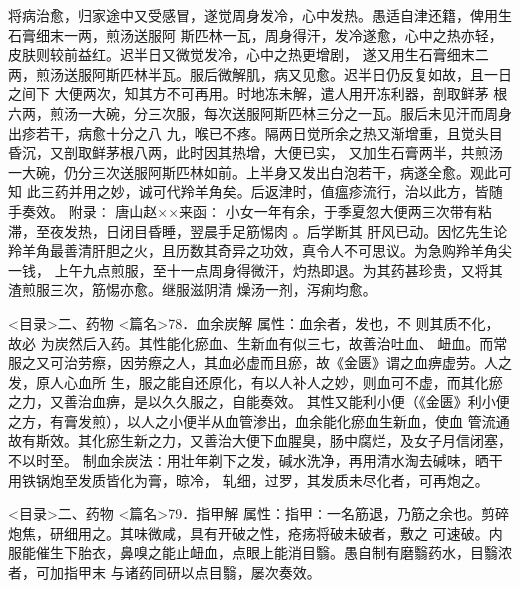 \documentclass[a4paper,12pt,UTF8,twoside]{ctexbook}
\begin{document}
将病治愈，归家途中又受感冒，遂觉周身发冷，心中发热。愚适自津还籍，俾用生石膏细末一两，煎汤送服阿 
斯匹林一瓦，周身得汗，发冷遂愈，心中之热亦轻，皮肤则较前益红。迟半日又微觉发冷，心中之热更增剧， 
遂又用生石膏细末二两，煎汤送服阿斯匹林半瓦。服后微解肌，病又见愈。迟半日仍反复如故，且一日之间下 
大便两次，知其方不可再用。时地冻未解，遣人用开冻利器，剖取鲜茅 
根六两，煎汤一大碗，分三次服，每次送服阿斯匹林三分之一瓦。服后未见汗而周身出疹若干，病愈十分之八 
九，喉已不疼。隔两日觉所余之热又渐增重，且觉头目昏沉，又剖取鲜茅根八两，此时因其热增，大便已实， 
又加生石膏两半，共煎汤一大碗，仍分三次送服阿斯匹林如前。上半身又发出白泡若干，病遂全愈。观此可知 
此三药并用之妙，诚可代羚羊角矣。后返津时，值瘟疹流行，治以此方，皆随手奏效。 
附录∶ 
唐山赵××来函∶ 
小女一年有余，于季夏忽大便两三次带有粘滞，至夜发热，日闭目昏睡，翌晨手足筋惕肉 。后学断其 
肝风已动。因忆先生论羚羊角最善清肝胆之火，且历数其奇异之功效，真令人不可思议。为急购羚羊角尖一钱， 
上午九点煎服，至十一点周身得微汗，灼热即退。为其药甚珍贵，又将其渣煎服三次，筋惕亦愈。继服滋阴清 
燥汤一剂，泻痢均愈。 

<目录>二、药物
<篇名>78．血余炭解
属性：血余者，发也，不 则其质不化，故必 为炭然后入药。其性能化瘀血、生新血有似三七，故善治吐血、 
衄血。而常服之又可治劳瘵，因劳瘵之人，其血必虚而且瘀，故《金匮》谓之血痹虚劳。人之发，原人心血所 
生，服之能自还原化，有以人补人之妙，则血可不虚，而其化瘀之力，又善治血痹，是以久久服之，自能奏效。 
其性又能利小便（《金匮》利小便之方，有膏发煎），以人之小便半从血管渗出，血余能化瘀血生新血，使血 
管流通故有斯效。其化瘀生新之力，又善治大便下血腥臭，肠中腐烂，及女子月信闭塞，不以时至。 
制血余炭法∶用壮年剃下之发，碱水洗净，再用清水淘去碱味，晒干用铁锅炮至发质皆化为膏，晾冷， 
轧细，过罗，其发质未尽化者，可再炮之。 

<目录>二、药物
<篇名>79．指甲解
属性：指甲∶一名筋退，乃筋之余也。剪碎炮焦，研细用之。其味微咸，具有开破之性，疮疡将破未破者，敷之 
可速破。内服能催生下胎衣，鼻嗅之能止衄血，点眼上能消目翳。愚自制有磨翳药水，目翳浓者，可加指甲末 
与诸药同研以点目翳，屡次奏效。 
\end{document}
